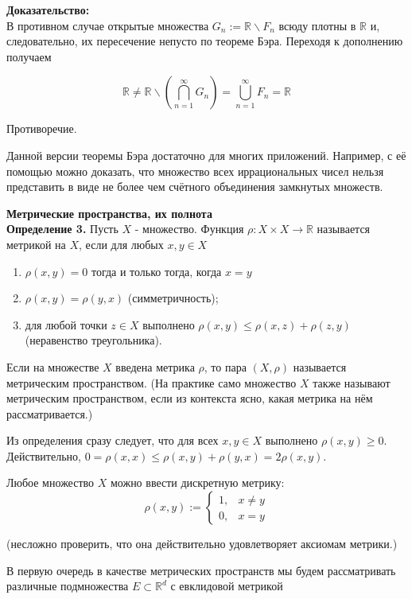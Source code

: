\documentclass[a4paper,12pt]{article} %
\begin{document}
\textbf{Доказательство:\\}
В противном случае открытые множества $G_{n}:=\mathbb{R} \backslash F_{n}$ всюду плотны в $\mathbb{R}$ и, следовательно, их пересечение непусто по теореме Бэра. Переходя к дополнению получаем

$$
\mathbb{R} \neq \mathbb{R} \backslash\left(\bigcap_{n=1}^{\infty} G_{n}\right)=\bigcup_{n=1}^{\infty} F_{n}=\mathbb{R}
$$

Противоречие.

Данной версии теоремы Бэра достаточно для многих приложений. Например, с её помощью можно доказать, что множество всех иррациональных чисел нельзя представить в виде не более чем счётного объединения замкнутых множеств.

\textbf{Метрические пространства, их полнота}\\
\textbf{Определение 3.} Пусть $X$ - множество. Функция $\rho: X \times X \rightarrow \mathbb{R}$ называется метрикой на $X$, если для любых $x, y \in X$

\begin{enumerate}
  \item $\rho(x, y)=0$ тогда и только тогда, когда $x=y$

  \item $\rho(x, y)=\rho(y, x)$ (симметричность);

  \item для любой точки $z \in X$ выполнено $\rho(x, y) \leq \rho(x, z)+\rho(z, y)$ (неравенство треугольника).

\end{enumerate}

Если на множестве $X$ введена метрика $\rho$, то пара $(X, \rho)$ называется метрическим пространством. (На практике само множество $X$ также называют метрическим пространством, если из контекста ясно, какая метрика на нём рассматривается.)

Из определения сразу следует, что для всех $x, y \in X$ выполнено $\rho(x, y) \geq 0$. Действительно, $0=\rho(x, x) \leq \rho(x, y)+\rho(y, x)=2 \rho(x, y)$.

Любое множество $X$ можно ввести дискретную метрику:
$$
\rho(x, y):= \begin{cases}1, & x \neq y \\ 0, & x=y\end{cases}
$$

(несложно проверить, что она действительно удовлетворяет аксиомам метрики.)

В первую очередь в качестве метрических пространств мы будем рассматривать различные подмножества $E \subset \mathbb{R}^{d}$ с евклидовой метрикой
\end{document}
